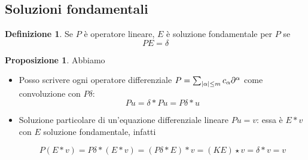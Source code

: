 \documentclass[a4paper,10pt]{article}
\theoremstyle{definition}
\theoremstyle{indentdefinition}
\newtheorem{defn}{Definizione}[section]
\theoremstyle{indenttheorem}
\newtheorem{prop}{Proposizione}
\theoremstyle{myremark}
\theoremstyle{indentgeneral}
\newenvironment{myboxed} 
{\noindent\begin{lrbox}{\mybox}\begin{minipage}{\textwidth}}
{\end{minipage}\end{lrbox}\fbox{\usebox{\mybox}}}
\begin{document}
\subsection{Soluzioni fondamentali}
\begin{defn}
    Se $P$ è operatore lineare, $E$ è soluzione fondamentale per $P$ se 
    $$PE=\delta$$
\end{defn}
\begin{myboxed}
\begin{prop}
    Abbiamo
    \begin{itemize}
        \item Posso scrivere ogni operatore differenziale $P=\sum_{\abs{\alpha}\le m}c_\alpha\partial^\alpha$ come convoluzione con $P\delta$:
        $$Pu=\delta*Pu=P\delta*u$$
        \item Soluzione particolare di un'equazione differenziale lineare $Pu=v$: essa è $E*v$ con $E$ soluzione fondamentale, infatti
        
        $$P(E*v)=P\delta*(E*v)=(P\delta*E)*v=(KE)\star v=\delta*v=v$$
    \end{itemize}
\end{prop}
\end{myboxed}
\end{document}
